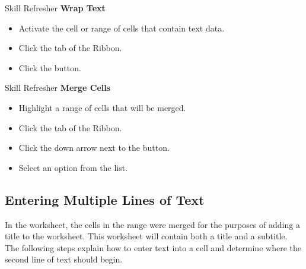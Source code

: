 \begin{center}
	\begin{sklbox}{Skill Refresher}
		\textbf{Wrap Text}
		\\
		\begin{itemize}
			\setlength{\itemsep}{0pt}
			\setlength{\parskip}{0pt}
			\setlength{\parsep}{0pt}
			
			\item Activate the cell or range of cells that contain text data.
			\item Click the  tab of the Ribbon.
			\item Click the  button.

		\end{itemize}
	\end{sklbox}
\end{center}

\begin{center}
	\begin{sklbox}{Skill Refresher}
		\textbf{Merge Cells}
		\\
		\begin{itemize}
			\setlength{\itemsep}{0pt}
			\setlength{\parskip}{0pt}
			\setlength{\parsep}{0pt}
			
			\item Highlight a range of cells that will be merged.
			\item Click the  tab of the Ribbon.
			\item Click the down arrow next to the  button.
			\item Select an option from the  list.
			
		\end{itemize}
	\end{sklbox}
\end{center}


\subsection{Entering Multiple Lines of Text}

In the  worksheet, the cells in the range  were merged for the purposes of adding a title to the worksheet. This worksheet will contain both a title and a subtitle. The following steps explain how to enter text into a cell and determine where the second line of text should begin.


